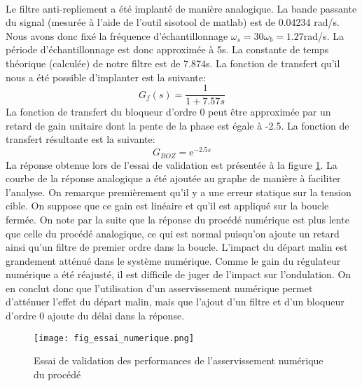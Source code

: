 \paragraph{}Le filtre anti-repliement a été implanté de manière analogique. La bande passante du signal (mesurée à l'aide de l'outil sisotool de matlab) est de 0.04234 rad/s. Nous avons donc fixé la fréquence d'échantillonnage $\omega_s = 30\omega_b = 1.27$rad/s. La période d'échantillonnage est donc approximée à 5s. La constante de temps théorique (calculée) de notre filtre est de 7.874s. La fonction de transfert qu'il nous a été possible d'implanter est la suivante:
\begin{equation}
G_f(s) = \frac{1}{1 + 7.57s}
\end{equation}
La fonction de transfert du bloqueur d'ordre 0 peut être approximée par un retard de gain unitaire dont la pente de la phase est égale à -2.5. La fonction de transfert résultante est la suivante:
\begin{equation}
G_{BOZ} = \mbox{e}^{-2.5s}
\end{equation}
La réponse obtenue lors de l'essai de validation est présentée à la figure \ref{fig6}. La courbe de la réponse analogique a été ajoutée au graphe de manière à faciliter l'analyse. On remarque premièrement qu'il y a une erreur statique sur la tension cible. On suppose que ce gain est linéaire et qu'il est appliqué sur la boucle fermée. On note par la suite que la réponse du procédé numérique est plus lente que celle du procédé analogique, ce qui est normal puisqu'on ajoute un retard ainsi qu'un filtre de premier ordre dans la boucle. L'impact du départ malin est grandement atténué dans le système numérique. Comme le gain du régulateur numérique a été réajusté, il est difficile de juger de l'impact sur l'ondulation. On en conclut donc que l'utilisation d'un asservissement numérique permet d'atténuer l'effet du départ malin, mais que l'ajout d'un filtre et d'un bloqueur d'ordre 0 ajoute du délai dans la réponse.
\begin{figure}[htbp]
\centering
\texttt{[image: fig\_essai\_numerique.png]}
\caption{Essai de validation des performances de l'asservissement numérique du procédé}
\label{fig6}
\end{figure}

